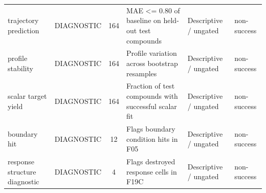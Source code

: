 \begin{table}[t]
\begin{tabular}{llclll}
trajectory prediction & DIAGNOSTIC & 164 & MAE <= 0.80 of baseline on held-out test compounds & Descriptive / ungated & non-success \\
profile stability & DIAGNOSTIC & 164 & Profile variation across bootstrap resamples & Descriptive / ungated & non-success \\
scalar target yield & DIAGNOSTIC & 164 & Fraction of test compounds with successful scalar fit & Descriptive / ungated & non-success \\
boundary hit & DIAGNOSTIC & 12 & Flags boundary condition hits in F05 & Descriptive / ungated & non-success \\
response structure diagnostic & DIAGNOSTIC & 4 & Flags destroyed response cells in F19C & Descriptive / ungated & non-success \\
\bottomrule
\end{tabular}
\end{table}
